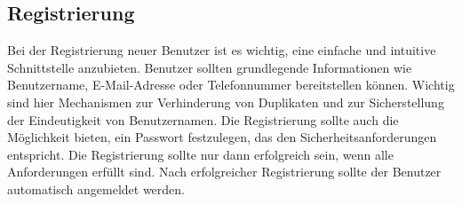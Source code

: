\subsection{Registrierung}
\label{subsec:registrierung}


Bei der Registrierung neuer Benutzer ist es wichtig, eine einfache und intuitive Schnittstelle anzubieten. Benutzer sollten grundlegende Informationen wie Benutzername, E-Mail-Adresse oder Telefonnummer bereitstellen können. Wichtig sind hier Mechanismen zur Verhinderung von Duplikaten und zur Sicherstellung der Eindeutigkeit von Benutzernamen. Die Registrierung sollte auch die Möglichkeit bieten, ein Passwort festzulegen, das den Sicherheitsanforderungen entspricht. Die Registrierung sollte nur dann erfolgreich sein, wenn alle Anforderungen erfüllt sind. Nach erfolgreicher Registrierung sollte der Benutzer automatisch angemeldet werden.

